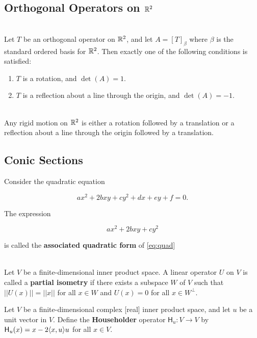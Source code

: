 \subsection*{Orthogonal Operators on $\mathbb{R}^2$}

\begin{theorem}
	\hfill\\
	Let $T$ be an orthogonal operator on $\mathbb{R}^2$, and let $A = [T]_\beta$ where $\beta$ is the standard ordered basis for $\mathbb{R}^2$. Then exactly one of the following conditions is satisfied:

	\begin{enumerate}
		\item $T$ is a rotation, and $\det(A) = 1$.
		\item $T$ is a reflection about a line through the origin, and $\det(A) = -1$.
	\end{enumerate}
\end{theorem}

\begin{corollary}
	\hfill\\
	Any rigid motion on $\mathbb{R}^2$ is either a rotation followed by a translation or a reflection about a line through the origin followed by a translation.
\end{corollary}

\subsection*{Conic Sections}

\begin{definition}
	Consider the quadratic equation

	\begin{equation}\label{eq:quad}
		ax^2 + 2bxy + cy^2 +dx + ey + f = 0.
	\end{equation}

	The expression

	\[ax^2 + 2bxy + cy^2\]

	is called the \textbf{associated quadratic form} of \eqref{eq:quad}
\end{definition}

\begin{definition}
	\hfill\\
	Let $V$ be a finite-dimensional inner product space. A linear operator $U$ on $V$ is called a \textbf{partial isometry} if there exists a subspace $W$ of $V$ such that $||U(x)|| = ||x||$ for all $x \in W$ and $U(x) = 0$ for all $x \in W^\perp$.
\end{definition}

\begin{definition}
	Let $V$ be a finite-dimensional complex [real] inner product space, and let $u$ be a unit vector in $V$. Define the \textbf{Householder} operator $\mathsf{H}_u: V \to V$ by $\mathsf{H}_u(x) = x-2\langle x,u\rangle u$ for all $x \in V$.
\end{definition}
